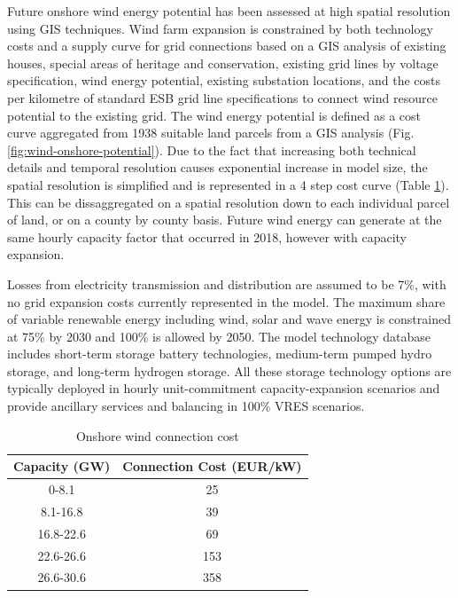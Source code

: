 \documentclass[gmd,manuscript]{copernicus}
\begin{document}
Future onshore wind energy potential has been assessed at high spatial resolution using GIS techniques. Wind farm expansion is constrained by both technology costs and a supply curve for grid connections based on a GIS analysis of existing houses, special areas of heritage and conservation, existing grid lines by voltage specification, wind energy potential, existing substation locations, and the costs per kilometre of standard ESB grid line specifications to connect wind resource potential to the existing grid. The wind energy potential is defined as a cost curve aggregated from 1938 suitable land parcels from a GIS analysis (Fig. \ref{fig:wind-onshore-potential}). Due to the fact that increasing both technical details and temporal resolution causes exponential increase in model size, the spatial resolution is simplified and is represented in a 4 step cost curve (Table \ref{onshore-wind-connection-cost}). This can be dissaggregated on a spatial resolution down to each individual parcel of land, or on a county by county basis. Future wind energy can generate at the same hourly capacity factor that occurred in 2018, however with capacity expansion.

Losses from electricity transmission and distribution are assumed to be 7\%, with no grid expansion costs currently represented in the model. The maximum share of variable renewable energy including wind, solar and wave energy is constrained at 75\% by 2030 and 100\% is allowed by 2050. The model technology database includes short-term storage battery technologies, medium-term pumped hydro storage, and long-term hydrogen storage. All these storage technology options are typically deployed in hourly unit-commitment capacity-expansion scenarios and provide ancillary services and balancing in 100\% VRES scenarios.

\begin{table}[ht]
 \centering
 \footnotesize
 \caption{Onshore wind connection cost }
 \begin{tabular}{cc}
 \hline 
 Capacity (GW) & Connection Cost (EUR/kW)\\ 
 \hline
 0-8.1 & 25 \\
 
 8.1-16.8 & 39 \\
 
 16.8-22.6 & 69 \\
 
 22.6-26.6 & 153 \\
 
 26.6-30.6 & 358 \\
 
 \hline
 \end{tabular}
 
 \label{onshore-wind-connection-cost}
\end{table}
\end{document}
